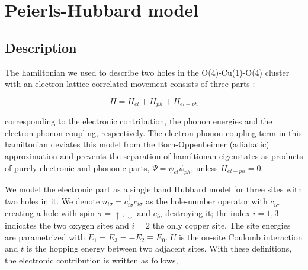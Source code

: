 \chapter{Peierls-Hubbard model}
\label{chap:model}



\section{Description}

The hamiltonian we used to describe two holes in the O(4)-Cu(1)-O(4) cluster with an electron-lattice correlated movement consists of three parts \cite{Salkola1994}:

\begin{equation}\label{eq:full-hamiltonian}
H = H_{el} + H_{ph} + H_{el-ph}
\end{equation}

\noindent corresponding to the electronic contribution, the phonon energies and the electron-phonon coupling, respectively. 
The electron-phonon coupling term in this hamiltonian deviates this model from the Born-Oppenheimer (adiabatic) approximation and prevents the separation of hamiltionan eigenstates as products of purely electronic and phononic parts, $\Psi=\psi_{el}\psi_{ph}$, unless $H_{el-ph}=0$.

We model the electronic part as a single band Hubbard model for three sites with two holes in it. 
We denote $n_{i\sigma}=c_{i\sigma}^\dagger c_{i\sigma}$ as the hole-number operator with $c_{i\sigma}^\dagger$ creating a hole with spin $\sigma = \uparrow, \downarrow$ and $c_{i\sigma}$ destroying it; the index $i=1,3$ indicates the two oxygen sites and $i=2$ the only copper site. 
The site energies are parametrized with $E_1=E_3=-E_2 \equiv E_0$. 
$U$ is the on-site Coulomb interaction and $t$ is the hopping energy between two adjacent sites. 
With these definitions, the electronic contribution is written as follows,

